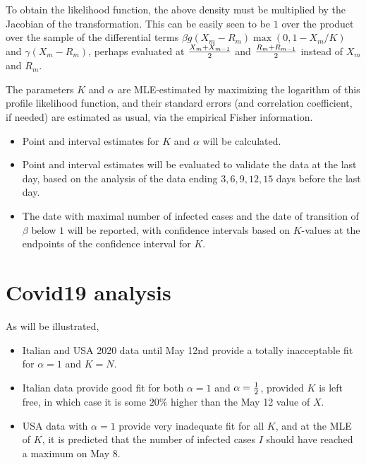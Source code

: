 \documentclass{article}
\begin{document}
{To obtain the likelihood function, the above density must be multiplied by the Jacobian of the transformation. This can be easily seen to be $1$ over the product over the sample of the differential terms $\beta g(X_m-R_m)\max(0,1-X_m/K)$ and $\gamma (X_m-R_m)$, perhaps evaluated at
${{X_m+X_{m-1}} \over 2}$ and ${{R_m+R_{m-1}} \over 2}$ instead of $X_m$ and $R_m$.

\bigskip

The parameters $K$ and $\alpha$ are MLE-estimated by maximizing the logarithm of this profile likelihood function, and their standard errors (and correlation coefficient, if needed) are estimated as usual, via the empirical Fisher information.

\begin{itemize}

\item Point and interval estimates for $K$ and $\alpha$ will be calculated.

\item Point and interval estimates will be evaluated to validate the data at the last day, based on the analysis of the data ending $3,6,9,12,15$ days before the last day.

\item The date with maximal number of infected cases and the date of transition of $\beta$ below $1$ will be reported, with confidence intervals based on $K$-values at the endpoints of the confidence interval for $K$.

\end{itemize}

\section{Covid19 analysis} \label{Covid19}

As will be illustrated,

\begin{itemize}

\item Italian and USA 2020 data until May 12nd provide a totally inacceptable fit for $\alpha=1$ and $K=N$.

\item Italian data provide good fit for both $\alpha=1$ and $\alpha={1 \over 2}$, provided $K$ is left free, in which case it is some $20\%$ higher than the May 12 value of $X$.

\item USA data with $\alpha=1$ provide very inadequate fit for all $K$, and at the MLE of $K$, it is predicted that the number of infected cases $I$ should have reached a maximum on May 8.


\end{itemize}}
\end{document}
